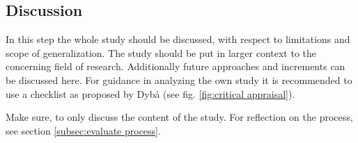 
\subsection{Discussion}
\label{subsec:discussion}

In this step the whole study should be discussed, with respect to limitations and scope of generalization. The study should be put in larger context to the concerning field of research. Additionally future approaches and increments can be discussed here. For guidance in analyzing the own study it is recommended to use a checklist as proposed by Dyb{\aa} \etal (see fig. \ref{fig:critical appraisal}).

Make sure, to only discuss the content of the study. For reflection on the process, see section \ref{subsec:evaluate process}.
